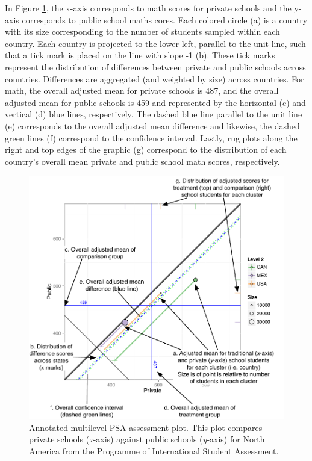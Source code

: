\documentclass[letterpaper,12pt]{article} %
\begin{document}
In Figure \ref{fig:g8math:circ}, the x-axis corresponds to math scores for private schools and the y-axis corresponds to public school maths cores. Each colored circle (a) is a country with its size corresponding to the number of students sampled within each country. Each country is projected to the lower left, parallel to the unit line, such that a tick mark is placed on the line with slope -1 (b). These tick marks represent the distribution of differences between private and public schools across countries. Differences are aggregated (and weighted by size) across countries. For math, the overall adjusted mean for private schools is 487, and the overall adjusted mean for public schools is 459 and represented by the horizontal (c) and vertical (d) blue lines, respectively. The dashed blue line parallel to the unit line (e) corresponds to the overall adjusted mean difference and likewise, the dashed green lines (f) correspond to the confidence interval. Lastly, rug plots along the right and top edges of the graphic (g) correspond to the distribution of each country's overall mean private and public school math scores, respectively.

\setlength{\belowcaptionskip}{-10pt}
\begin{figure}[t!]
\begin{center}
\includegraphics[width=.9\textwidth]{../Figures/AnnotatedCircPlot.pdf}
\caption[Annotated multilevel PSA assessment plot]{Annotated multilevel PSA assessment plot. This plot compares private schools (\textit{x}-axis) against public schools (\textit{y}-axis) for North America from the Programme of International Student Assessment.}
\label{fig:g8math:circ}
\end{center}
\end{figure}
\setlength{\belowcaptionskip}{0pt}
\end{document}

